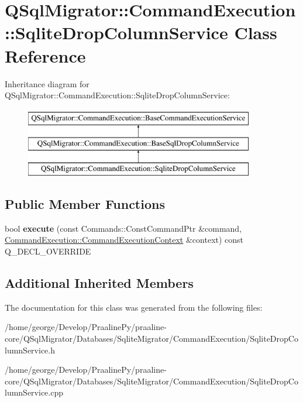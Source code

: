 \hypertarget{class_q_sql_migrator_1_1_command_execution_1_1_sqlite_drop_column_service}{}\section{Q\+Sql\+Migrator\+:\+:Command\+Execution\+:\+:Sqlite\+Drop\+Column\+Service Class Reference}
\label{class_q_sql_migrator_1_1_command_execution_1_1_sqlite_drop_column_service}
Inheritance diagram for Q\+Sql\+Migrator\+:\+:Command\+Execution\+:\+:Sqlite\+Drop\+Column\+Service\+:\begin{figure}[H]
\begin{center}
\leavevmode
\includegraphics[height=3.000000cm]{class_q_sql_migrator_1_1_command_execution_1_1_sqlite_drop_column_service}
\end{center}
\end{figure}
\subsection*{Public Member Functions}
\begin{DoxyCompactItemize}
\item 
\mbox{\label{class_q_sql_migrator_1_1_command_execution_1_1_sqlite_drop_column_service_aa489c9b77a3da0f5b85929448ca83c1b}} 
bool {\bfseries execute} (const Commands\+::\+Const\+Command\+Ptr \&command, \hyperlink{class_q_sql_migrator_1_1_command_execution_1_1_command_execution_context}{Command\+Execution\+::\+Command\+Execution\+Context} \&context) const Q\+\_\+\+D\+E\+C\+L\+\_\+\+O\+V\+E\+R\+R\+I\+DE
\end{DoxyCompactItemize}
\subsection*{Additional Inherited Members}


The documentation for this class was generated from the following files\+:\begin{DoxyCompactItemize}
\item 
/home/george/\+Develop/\+Praaline\+Py/praaline-\/core/\+Q\+Sql\+Migrator/\+Databases/\+Sqlite\+Migrator/\+Command\+Execution/Sqlite\+Drop\+Column\+Service.\+h\item 
/home/george/\+Develop/\+Praaline\+Py/praaline-\/core/\+Q\+Sql\+Migrator/\+Databases/\+Sqlite\+Migrator/\+Command\+Execution/Sqlite\+Drop\+Column\+Service.\+cpp\end{DoxyCompactItemize}
